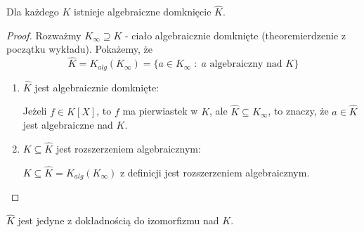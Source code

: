 \begin{remark}
    Dla każdego $K$ istnieje algebraiczne domknięcie $\hat{K}$.
\end{remark}

\begin{proof}
Rozważmy $K_\infty\supseteq K$ - ciało algebraicznie domknięte (theoremierdzenie z początku wykładu). Pokażemy, że
$$\hat{K}=K_{alg}(K_\infty)=\{a\in K_\infty\;:\;a\text{ algebraiczny nad }K\}$$
\begin{enumerate}
    \item $\hat{K}$ jest algebraicznie domknięte:

    Jeżeli $f\in\hat{K}[X]$, to $f$ ma pierwiastek w $K$, ale $\hat{K}\subseteq K_\infty$, to znaczy, że $a\in\hat{K}$ jest algebraiczne nad $K$.

    \item $K\subseteq\hat{K}$ jest rozszerzeniem algebraicznym:

    $K\subseteq\widehat{K}=K_{alg}(K_\infty)$ z definicji jest rozszerzeniem algebraicznym.
\end{enumerate}
\end{proof}

\begin{theorem}\label{tw:4:15}
    $\hat{K}$ jest jedyne z dokładnością do izomorfizmu nad $K$.
\end{theorem}

\begin{center}
\end{center}

